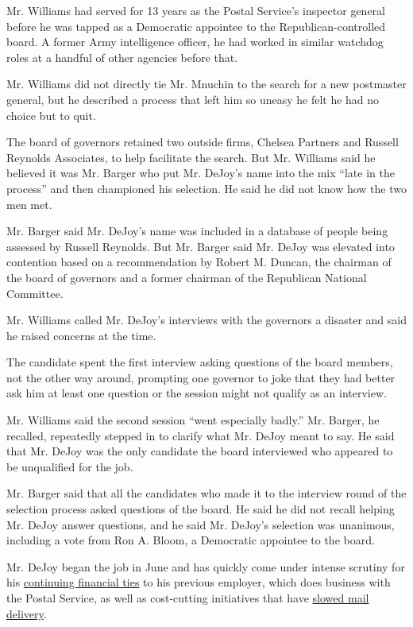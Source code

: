 Mr. Williams had served for 13 years as the Postal Service's inspector
general before he was tapped as a Democratic appointee to the
Republican-controlled board. A former Army intelligence officer, he had
worked in similar watchdog roles at a handful of other agencies before
that.

Mr. Williams did not directly tie Mr. Mnuchin to the search for a new
postmaster general, but he described a process that left him so uneasy
he felt he had no choice but to quit.

The board of governors retained two outside firms, Chelsea Partners and
Russell Reynolds Associates, to help facilitate the search. But Mr.
Williams said he believed it was Mr. Barger who put Mr. DeJoy's name
into the mix ``late in the process'' and then championed his selection.
He said he did not know how the two men met.

Mr. Barger said Mr. DeJoy's name was included in a database of people
being assessed by Russell Reynolds. But Mr. Barger said Mr. DeJoy was
elevated into contention based on a recommendation by Robert M. Duncan,
the chairman of the board of governors and a former chairman of the
Republican National Committee.

Mr. Williams called Mr. DeJoy's interviews with the governors a disaster
and said he raised concerns at the time.

The candidate spent the first interview asking questions of the board
members, not the other way around, prompting one governor to joke that
they had better ask him at least one question or the session might not
qualify as an interview.

Mr. Williams said the second session ``went especially badly.'' Mr.
Barger, he recalled, repeatedly stepped in to clarify what Mr. DeJoy
meant to say. He said that Mr. DeJoy was the only candidate the board
interviewed who appeared to be unqualified for the job.

Mr. Barger said that all the candidates who made it to the interview
round of the selection process asked questions of the board. He said he
did not recall helping Mr. DeJoy answer questions, and he said Mr.
DeJoy's selection was unanimous, including a vote from Ron A. Bloom, a
Democratic appointee to the board.

Mr. DeJoy began the job in June and has quickly come under intense
scrutiny for his
\href{https://www.nytimes3xbfgragh.onion/2020/08/17/us/politics/dejoy-postal-service-mail-in-voting.html}{continuing
financial ties} to his previous employer, which does business with the
Postal Service, as well as cost-cutting initiatives that have
\href{https://www.nytimes3xbfgragh.onion/2020/07/31/us/politics/trump-usps-mail-delays.html}{slowed
mail delivery}.

